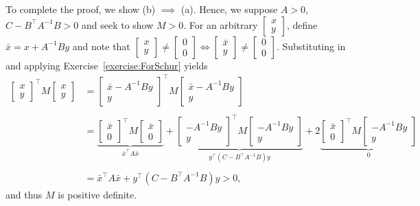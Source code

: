 To complete the proof, we show (b) $\implies$ (a). Hence, we suppose $A>0$, $C- B^\top A^{-1} B > 0$ and seek to show $M>0$. For an arbitrary $\begin{bmatrix} x \\ y \end{bmatrix}$, define $\bar{x} = x+A^{-1} B y$ and note that
		$\begin{bmatrix} x \\ y \end{bmatrix} \neq \begin{bmatrix} 0 \\ 0 \end{bmatrix} \iff \begin{bmatrix} \bar{x} \\ y \end{bmatrix} \neq \begin{bmatrix} 0 \\ 0 \end{bmatrix}$. Substituting in and applying Exercise~\ref{exercise:ForSchur} yields
        \begin{align*}
		\begin{bmatrix} x \\ y  \end{bmatrix} ^\top M \begin{bmatrix} x \\ y \end{bmatrix}
		  	& = \begin{bmatrix} \bar{x} -A^{-1}By \\ y  \end{bmatrix}^\top M
						\begin{bmatrix} \bar{x}-A^{-1}By \\ y   \end{bmatrix}  \\
						\\
		  	& =	\underbrace{\begin{bmatrix} \bar{x}  \\ 0 \end{bmatrix} ^\top M
		     		\begin{bmatrix} \bar{x} \\  0 \end{bmatrix}}_{\bar{x}^\top A \bar{x}} +
				 		\underbrace{\begin{bmatrix} -A^{-1} B y  \\ y	\end{bmatrix} ^\top M
						\begin{bmatrix} -A^{-1} B y \\  y	\end{bmatrix}}_{y^\top (C-B^\top A^{-1} B) y}
				 +  2 \underbrace{\begin{bmatrix} \bar{x} \\ 0 \end{bmatrix} ^\top M
						\begin{bmatrix} -A^{-1} B y \\  y	\end{bmatrix}}_{0} \\
						\\
			  & = \bar{x}^\top A \bar{x} + y^\top (C-B^\top A^{-1} B) y > 0,
		\end{align*}
and thus $M$ is positive definite. 
\Qed

